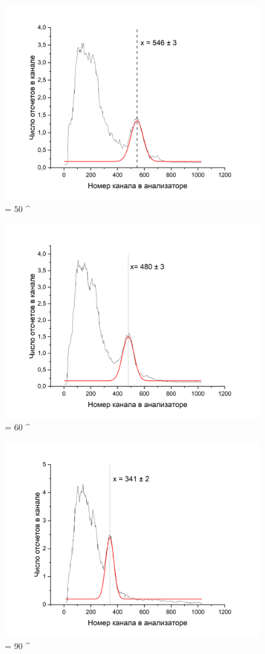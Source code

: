 \documentclass[a4paper,12pt]{article} %
\begin{document}
\begin{figure}[h!]
    \centering
    \includegraphics[scale=0.5]{оцифровка_50.png}
    \caption{\theta = 50 ^\circ}
\end{figure}

\begin{figure}[h!]
    \centering
    \includegraphics[scale=0.5]{оцифровка_60.png}
    \caption{\theta = 60 ^\circ}
\end{figure}

\begin{figure}[h!]
    \centering
    \includegraphics[scale=0.5]{оцифровка_90.png}
    \caption{\theta = 90 ^\circ}
\end{figure}
\end{document}
